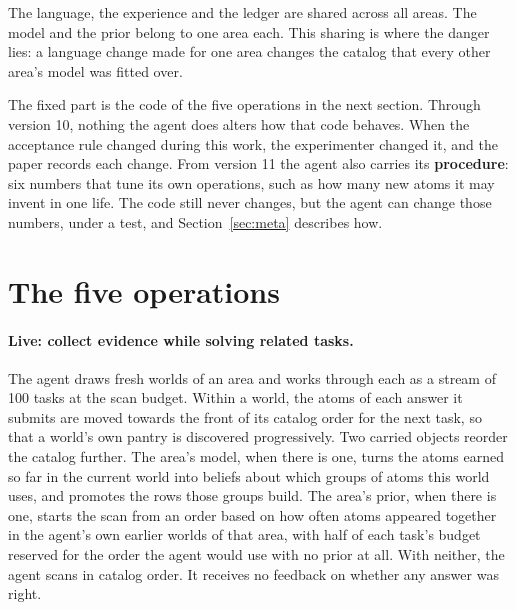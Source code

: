 \documentclass[11pt]{article}
\begin{document}
The language, the experience and the ledger are shared across all areas. The model and the prior belong to one area each. This sharing is where the danger lies: a language change made for one area changes the catalog that every other area's model was fitted over.

The fixed part is the code of the five operations in the next section. Through version 10, nothing the agent does alters how that code behaves. When the acceptance rule changed during this work, the experimenter changed it, and the paper records each change. From version 11 the agent also carries its \textbf{procedure}: six numbers that tune its own operations, such as how many new atoms it may invent in one life. The code still never changes, but the agent can change those numbers, under a test, and Section~\ref{sec:meta} describes how.

\section{The five operations}
\label{sec:ops}

\paragraph{Live: collect evidence while solving related tasks.} The agent draws fresh worlds of an area and works through each as a stream of 100 tasks at the scan budget. Within a world, the atoms of each answer it submits are moved towards the front of its catalog order for the next task, so that a world's own pantry is discovered progressively. Two carried objects reorder the catalog further. The area's model, when there is one, turns the atoms earned so far in the current world into beliefs about which groups of atoms this world uses, and promotes the rows those groups build. The area's prior, when there is one, starts the scan from an order based on how often atoms appeared together in the agent's own earlier worlds of that area, with half of each task's budget reserved for the order the agent would use with no prior at all. With neither, the agent scans in catalog order. It receives no feedback on whether any answer was right.
\end{document}
